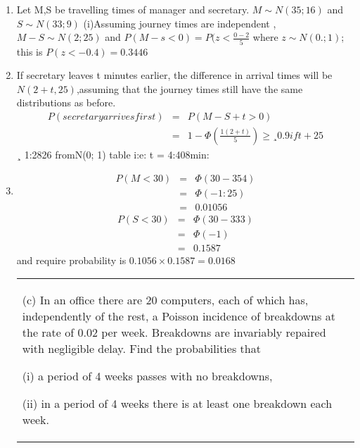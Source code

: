 \documentclass[a4paper,12pt]{article}
\begin{document}
\begin{enumerate}
\begin{table}[ht!]
\begin{tabular}{|p{15cm}|}
 \\ \hline
      \end{tabular}
    \end{table}
\item Let M,S be travelling times of manager and secretary.
$M \sim N(35; 16)$ and $S \sim N(33; 9)$
(i)Assuming journey times are independent ,
$M - S \sim N(2; 25)$ and $P(M - s < 0) = P(z <
\frac{0 - 2}{5}$
where $z \sim N(0.; 1)$; this is $P(z < -0.4) = 0.3446$
\item If secretary leaves t minutes earlier, the difference in arrival times will be $N(2+t,25)$,assuming
that the journey times still have the same distributions as before.
\begin{eqnarray*}
P(secretary arrives first) &=& P(M - S + t > 0)\\
&=& 1 - \Phi (\frac{1(2+t)}{5}) \geq¸ 0.9 if
t + 2
5
\end{eqnarray*}
¸ 1:2826 fromN(0; 1) table i:e: t = 4:408min:
\item
\begin{eqnarray*}
P(M < 30) &=& \Phi( 30-35
4 ) \\ &=& \Phi(-1:25)\\ &=& 0.01056
\end{eqnarray*}
\begin{eqnarray*}
P(S < 30)  &=&  \Phi( 30-33
3 ) \\ &=&  \Phi(-1) \\ &=&  0.1587
\end{eqnarray*}
and require probability is $0.1056 \times 0.1587 = 0.0168$

\newpage
  \begin{table}[ht!]
     \centering
     \begin{tabular}{|p{15cm}|}
     \hline  
(c) In an office there are 20 computers, each of which has, independently of the rest, a Poisson incidence of breakdowns at the rate of 0.02 per week.  Breakdowns are invariably repaired with negligible delay.  Find the probabilities that 
 
(i) a period of 4 weeks passes with no breakdowns, 

 
(ii) in a period of 4 weeks there is at least one breakdown each week. 
 

\end{tabular}
\end{table}
\end{enumerate}
\end{document}
